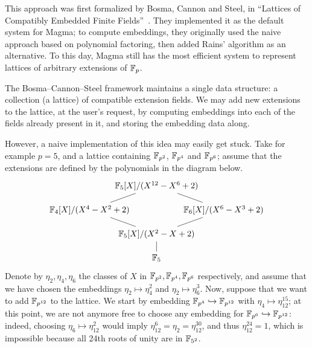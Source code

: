 \documentclass{report}
\theoremstyle{plain}
\theoremstyle{definition}
\begin{document}
This approach was first formalized by Bosma, Cannon and Steel, in
``Lattices of Compatibly Embedded Finite
Fields''~\cite{bosma+cannon+steel97}. %
They implemented it as the default system for Magma; to compute
embeddings, they originally used the naive approach based on
polynomial factoring, then added Rains' algorithm as an alternative. %
To this day, Magma still has the most efficient system to represent
lattices of arbitrary extensions of $\mathbb{F}_p$. %

The Bosma--Cannon--Steel framework maintains a single data structure:
a collection (a lattice) of compatible extension fields. %
We may add new extensions to the lattice, at the user's request, by
computing embeddings into each of the fields already present in it,
and storing the embedding data along. %

However, a naive implementation of this idea may easily get stuck. %
Take for example $p=5$, and a lattice containing $\mathbb{F}_{p^2}$,
$\mathbb{F}_{p^4}$ and $\mathbb{F}_{p^6}$; assume that the extensions are defined by
the polynomials in the diagram below. %
\begin{equation*}
  \begin{tikzpicture}
    \draw
    (0,-1) node (F0) {$\F_5$}
    (0,0) node(Fp) {$\F_5[X]/(X^2-X+2)$}
    (-1,1) node[anchor=east](Fpm) {$\F_4[X]/(X^4-X^2+2)$}
    (1,1) node[anchor=west](Fpn) {$\F_6[X]/(X^6-X^3+2)$}
    (0,2) node(Fpmn) {$\F_5[X]/(X^{12}-X^6+2)$};
    \draw
    (Fp) edge (Fpm) edge (Fpn) edge (F0)
    (Fpmn) edge (Fpm) edge (Fpn);
  \end{tikzpicture}
\end{equation*}
Denote by $η_2,η_4,η_6$ the classes of $X$ in
$\mathbb{F}_{p^2},\mathbb{F}_{p^4},\mathbb{F}_{p^6}$ respectively, and assume that we have
chosen the embeddings $η_2↦η_4^2$ and $η_2↦η_6^3$. %
Now, suppose that we want to add $\mathbb{F}_{p^{12}}$ to the lattice. %
We start by embedding $\mathbb{F}_{p^4}\hookrightarrow\mathbb{F}_{p^{12}}$ with
$η_4↦η_{12}^{15}$; at this point, we are not anymore free to choose
any embedding for $\mathbb{F}_{p^6}\hookrightarrow\mathbb{F}_{p^{12}}$: indeed,
choosing $η_6↦η_{12}^2$ would imply $η_{12}^{6}=η_2=η_{12}^{30}$, and
thus $η_{12}^{24}=1$, which is impossible because all 24th roots of
unity are in $\mathbb{F}_{5^2}$. %
\end{document}
